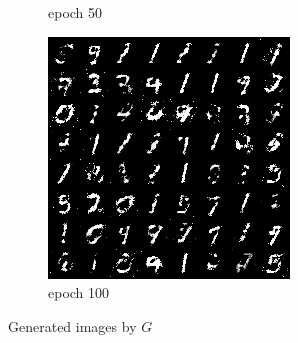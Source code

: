 \documentclass[a4paper]{article}
\theoremstyle{definition}
\begin{document}
\begin{enumerate} [label=(\alph*)]
\begin{figure}[H]
\begin{subfigure}[b]{0.3\textwidth}
			      \caption{epoch 50}
		      \end{subfigure}
		      \hfill
		      \begin{subfigure}[b]{0.3\textwidth}
			      \centering
			      \includegraphics[width=\textwidth]{gan_q1_epoch100.png}
			      \caption{epoch 100}
		      \end{subfigure}
		      \caption{Generated images by $G$}
		      \label{fig:three graphs}
	      \end{figure}



\end{enumerate}
\end{document}
